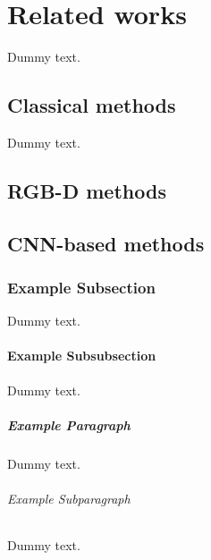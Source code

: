 \chapter{Related works}

Dummy text.

\section{Classical methods}

Dummy text.

\section{RGB-D methods}


\section{CNN-based methods}




\subsection{Example Subsection}

Dummy text.

\subsubsection{Example Subsubsection}

Dummy text.

\paragraph{Example Paragraph}

Dummy text.

\subparagraph{Example Subparagraph}

Dummy text.
